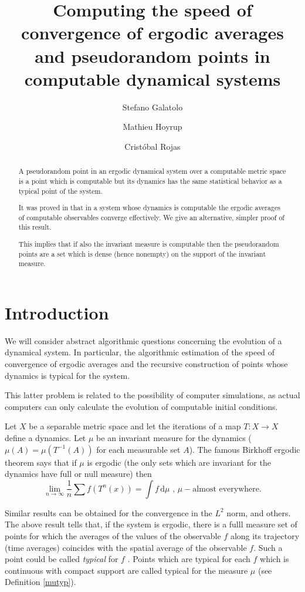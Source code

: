 \documentclass[copyright,creativecommons]{eptcs}
\title{Computing
the speed of convergence of ergodic averages and pseudorandom points in
computable dynamical systems}
\author{Stefano Galatolo
\institute{Dipartiento di matematica applicata \\
Universita di Pisa}
\email{s.galatolo@ing.unipi.it}
\and
Mathieu Hoyrup  \qquad\qquad
\institute{LORIA, Vandoeuvre-l es-Nancy, France}
\email{Mathieu.Hoyrup@loria.fr}
\and
Crist\' obal Rojas \qquad\qquad
\institute{Fields Institute, Toronto, Canada}
\email{ cristobal.rojas@utoronto.ca}
}
\numberwithin{equation}{section}
\begin{document}
\maketitle

\begin{abstract}
A pseudorandom point in an ergodic dynamical system over a computable metric
space is a point which is computable but its dynamics has the same
statistical behavior as a typical point of the system.

It was proved in \cite{AvigadGT10} that in a system whose dynamics is
computable the ergodic averages of computable observables converge
effectively. We give an alternative, simpler proof of this result.

This implies that if also the invariant measure is computable then the
pseudorandom points are a set which is dense (hence nonempty) on the support
of the invariant measure.
\end{abstract}

\section{Introduction}
We will consider abstract algorithmic questions concerning the evolution of
a dynamical system. In particular, the algorithmic estimation of the speed
of convergence of ergodic averages and the recursive construction of points
whose dynamics is typical for the system.

This latter problem is related to the possibility of computer simulations,
as actual computers can only calculate the evolution of computable initial
conditions.

Let $X$ be a separable metric space and let the iterations of a map $T:X\rightarrow X$
define a dynamics. Let $\mu $ be an invariant measure for the dynamics ($\mu
(A)=\mu (T^{-1}(A))$ for each measurable set $A$). The famous Birkhoff
ergodic theorem says that if $\mu $ is ergodic (the only sets which are
invariant for the dynamics have full or null measure) then\begin{equation*}
\underset{n\rightarrow \infty }{\lim }\frac{1}{n}\sum f(T^{n}(x))=\int \!{f}\,\mathrm{d}{\mu }\text{ , }\mu -\text{almost everywhere.}
\end{equation*}

Similar results can be obtained for the convergence in the $L^{2}$ norm, and
others. The above result tells that, if the system is ergodic, there is a
fulll measure set of points for which the averages of the values of the
observable $f$ along its trajectory (time averages) coincides with the
spatial average of the observable $f$. Such a point could be called \textit{typical }for $f$ . Points which are typical for each $f$ which is continuous
with compact support are called typical for the measure $\mu $ (see
Definition \ref{mutyp}).
\end{document}
